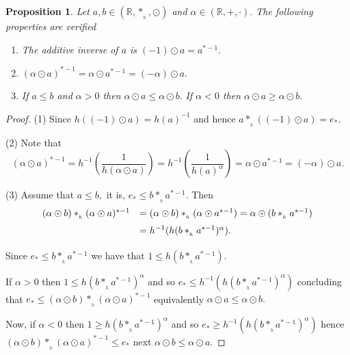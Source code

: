 \documentclass[10pt]{amsart}
\newtheorem{proposition}{Proposition}
\numberwithin{equation}{section}
\begin{document}
\begin{proposition}\label{Prop_odot}
Let \(a, b \in (\mathbb R,*_{_h}, \odot)\)  and $\alpha \in (\mathbb R,+,\cdot).$  The following properties are verified
\begin{enumerate}
    \item The additive inverse of $a$ is $(-1)\odot a=a^{*-1}.$
    \medskip
    
  \item  $(\alpha \odot a)^{*-1} = \alpha \odot a^{*-1} = (-\alpha) \odot a.$

\medskip

\item If $a \le b$ and  $\alpha > 0$ then $\alpha \odot a \le \alpha \odot b.$ If $\alpha <  0$ then $\alpha \odot a \ge  \alpha \odot b.$

    \end{enumerate}




\end{proposition}

\begin{proof}
(1) Since $h((-1)\odot a)=h(a)^{-1}$ and hence $a*_{_h}((-1)\odot a)=e_*$.
\medskip

(2) Note that 
$$
(\alpha \odot a)^{*-1} = h^{-1}\left( \frac{1}{h(\alpha \odot a)}\right) = h^{-1}\left( \frac{1}{h(a)^\alpha }\right) = \alpha \odot a^{*-1} = (-\alpha) \odot a.
$$

\medskip
(3) Assume that $a \le b,$ it is, $e_* \le b *_{_h} a^{*-1} $. Then 
$$
\begin{array}{rl}
\medskip
(\alpha \odot b) *_{_h} (\alpha \odot a)^{*-1} & = (\alpha \odot b) *_{_h} (\alpha \odot a^{*-1}) = \alpha \odot (b *_{_h}  a^{*-1}) \\
\medskip
& = h^{-1}(h(b *_{_h}  a^{*-1})^{\alpha}).
\end{array}
$$
Since $e_* \le b *_{_h} a^{*-1}$ we have that $1 \le h(b *_{_h}  a^{*-1}).$ 

\medskip

If $\alpha > 0 $ then $1 \le h(b *_{_h}  a^{*-1})^\alpha$  and so $e_* \le h^{-1}(h(b *_{_h}  a^{*-1})^\alpha)$
concluding that $e_* \le (\alpha \odot b) *_{_h} (\alpha \odot a)^{*-1}$ equivalently $\alpha \odot a \le \alpha \odot b.$

\medskip

Now, if $\alpha < 0 $ then $1 \ge  h(b *_{_h}  a^{*-1})^\alpha$  and so $e_* \ge h^{-1}(h(b *_{_h}  a^{*-1})^\alpha)$
hence $ (\alpha \odot b) *_{_h} (\alpha \odot a)^{*-1} \le e_*$ next  $\alpha \odot b \le \alpha \odot a.$
\end{proof}
\end{document}
